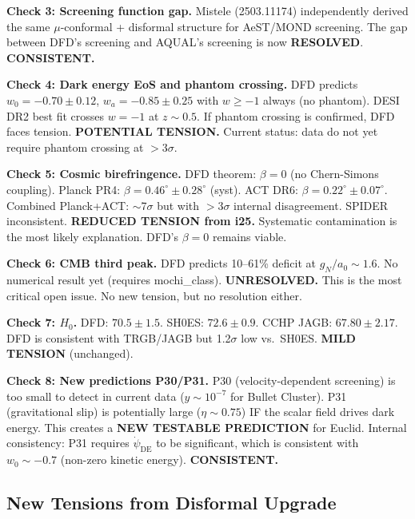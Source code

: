 \documentclass[11pt,a4paper]{article}
\begin{document}
\textbf{Check 3: Screening function gap.} Mistele (2503.11174) independently derived the same $\mu$-conformal + disformal structure for AeST/MOND screening. The gap between DFD's screening and AQUAL's screening is now \textbf{RESOLVED}. \textbf{CONSISTENT.}

\textbf{Check 4: Dark energy EoS and phantom crossing.} DFD predicts $w_0 = -0.70 \pm 0.12$, $w_a = -0.85 \pm 0.25$ with $w \geq -1$ always (no phantom). DESI DR2 best fit crosses $w = -1$ at $z \sim 0.5$. If phantom crossing is confirmed, DFD faces tension. \textbf{POTENTIAL TENSION.} Current status: data do not yet require phantom crossing at $>$3$\sigma$.

\textbf{Check 5: Cosmic birefringence.} DFD theorem: $\beta = 0$ (no Chern-Simons coupling). Planck PR4: $\beta = 0.46^\circ \pm 0.28^\circ$ (syst). ACT DR6: $\beta = 0.22^\circ \pm 0.07^\circ$. Combined Planck+ACT: $\sim$7$\sigma$ but with $>$3$\sigma$ internal disagreement. SPIDER inconsistent. \textbf{REDUCED TENSION from i25.} Systematic contamination is the most likely explanation. DFD's $\beta = 0$ remains viable.

\textbf{Check 6: CMB third peak.} DFD predicts 10--61\% deficit at $g_N/a_0 \sim 1.6$. No numerical result yet (requires mochi\_class). \textbf{UNRESOLVED.} This is the most critical open issue. No new tension, but no resolution either.

\textbf{Check 7: $H_0$.} DFD: $70.5 \pm 1.5$. SH0ES: $72.6 \pm 0.9$. CCHP JAGB: $67.80 \pm 2.17$. DFD is consistent with TRGB/JAGB but 1.2$\sigma$ low vs.\ SH0ES. \textbf{MILD TENSION} (unchanged).

\textbf{Check 8: New predictions P30/P31.} P30 (velocity-dependent screening) is too small to detect in current data ($y \sim 10^{-7}$ for Bullet Cluster). P31 (gravitational slip) is potentially large ($\eta \sim 0.75$) IF the scalar field drives dark energy. This creates a \textbf{NEW TESTABLE PREDICTION} for Euclid. Internal consistency: P31 requires $\dot{\psi}_\mathrm{DE}$ to be significant, which is consistent with $w_0 \sim -0.7$ (non-zero kinetic energy). \textbf{CONSISTENT.}

\subsection{New Tensions from Disformal Upgrade}
\end{document}
